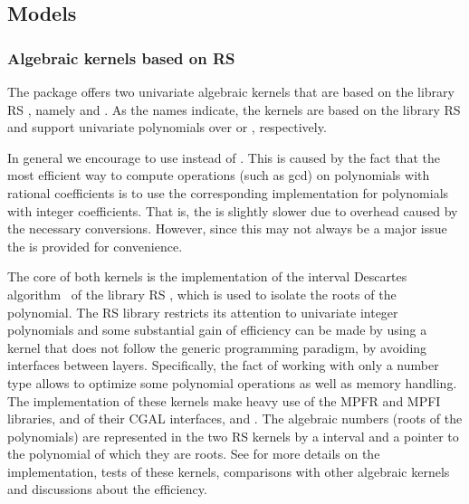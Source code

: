 
\subsection{Models}

\subsubsection{Algebraic kernels based on RS}

The package offers two univariate algebraic kernels that are based on 
the library RS \cite{cgal:r-rs}, namely 
and . As the names indicate, 
the kernels are based on the library RS \cite{cgal:r-rs} and support univariate 
polynomials over  or , respectively. 

In general we encourage to use 
instead of . This is caused by
the fact that the most efficient way to compute operations (such as gcd)
on polynomials with rational coefficients is to use the corresponding
implementation for polynomials with integer coefficients.  That is,
the  is slightly slower due to
overhead caused by the necessary conversions.  However, since this may
not always be a major issue the 
is provided for convenience.


The core of both kernels is the implementation of the interval Descartes 
algorithm~\cite{cgal:rz-jcam-04} of the library RS \cite{cgal:r-rs}, 
which is used to isolate the roots of the polynomial. 
The RS library restricts its attention to univariate integer
polynomials and some substantial gain of efficiency can be made by using a kernel
that does not follow the generic programming paradigm, by avoiding
interfaces between layers.  Specifically, the fact of working with
only a number type allows to optimize some polynomial operations
as well as memory handling.  The implementation of these kernels
make heavy use of the MPFR \cite{cgal:mt-mpfr} and MPFI \cite{cgal:r-mpfi}
libraries, and of their CGAL interfaces,  and .
The algebraic numbers (roots of the polynomials) are represented
in the two RS kernels by a  interval and a pointer to
the polynomial of which they are roots.  See \cite{cgal:lpt-wea-09} 
for more details on the implementation, tests of these kernels,
comparisons with other algebraic kernels and discussions about the
efficiency.  


